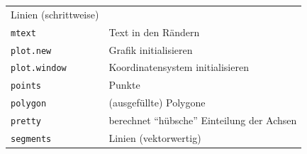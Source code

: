 \documentclass[]{book}
\begin{document}
\begin{longtable}[]{@{}ll@{}}
\begin{minipage}[t]{0.56\columnwidth}
Linien (schrittweise)\strut
\end{minipage}\tabularnewline
\begin{minipage}[t]{0.38\columnwidth}\raggedright
\texttt{mtext}\strut
\end{minipage} & \begin{minipage}[t]{0.56\columnwidth}\raggedright
Text in den Rändern\strut
\end{minipage}\tabularnewline
\begin{minipage}[t]{0.38\columnwidth}\raggedright
\texttt{plot.new}\strut
\end{minipage} & \begin{minipage}[t]{0.56\columnwidth}\raggedright
Grafik initialisieren\strut
\end{minipage}\tabularnewline
\begin{minipage}[t]{0.38\columnwidth}\raggedright
\texttt{plot.window}\strut
\end{minipage} & \begin{minipage}[t]{0.56\columnwidth}\raggedright
Koordinatensystem initialisieren\strut
\end{minipage}\tabularnewline
\begin{minipage}[t]{0.38\columnwidth}\raggedright
\texttt{points}\strut
\end{minipage} & \begin{minipage}[t]{0.56\columnwidth}\raggedright
Punkte\strut
\end{minipage}\tabularnewline
\begin{minipage}[t]{0.38\columnwidth}\raggedright
\texttt{polygon}\strut
\end{minipage} & \begin{minipage}[t]{0.56\columnwidth}\raggedright
(ausgefüllte) Polygone\strut
\end{minipage}\tabularnewline
\begin{minipage}[t]{0.38\columnwidth}\raggedright
\texttt{pretty}\strut
\end{minipage} & \begin{minipage}[t]{0.56\columnwidth}\raggedright
berechnet ``hübsche'' Einteilung der Achsen\strut
\end{minipage}\tabularnewline
\begin{minipage}[t]{0.38\columnwidth}\raggedright
\texttt{segments}\strut
\end{minipage} & \begin{minipage}[t]{0.56\columnwidth}\raggedright
Linien (vektorwertig)\strut
\end{minipage}\tabularnewline

\end{longtable}
\end{document}

